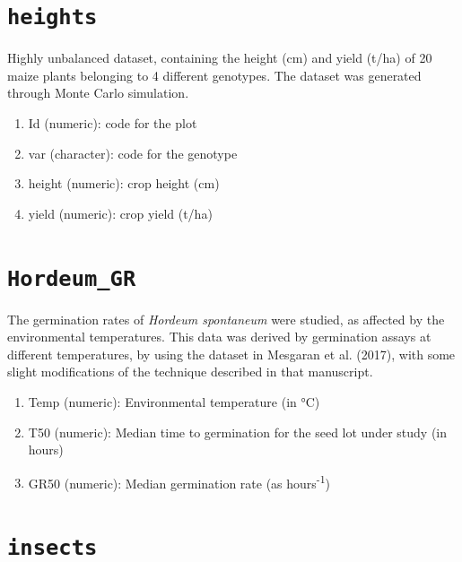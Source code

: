 \documentclass[
  letterpaper,
  DIV=11,
  numbers=noendperiod]{scrreprt}
\providecommand{\tightlist}{%
  \setlength{\itemsep}{0pt}\setlength{\parskip}{0pt}}
\begin{document}
\section*{\texorpdfstring{\texttt{heights}}{heights}}\label{heights}


Highly unbalanced dataset, containing the height (cm) and yield (t/ha)
of 20 maize plants belonging to 4 different genotypes. The dataset was
generated through Monte Carlo simulation.

\begin{enumerate}
\def\labelenumi{\arabic{enumi}.}
\tightlist
\item
  Id (numeric): code for the plot
\item
  var (character): code for the genotype
\item
  height (numeric): crop height (cm)
\item
  yield (numeric): crop yield (t/ha)
\end{enumerate}

\section*{\texorpdfstring{\texttt{Hordeum\_GR}}{Hordeum\_GR}}\label{Hordeum_GR}


The germination rates of \emph{Hordeum spontaneum} were studied, as
affected by the environmental temperatures. This data was derived by
germination assays at different temperatures, by using the dataset in
Mesgaran et al. (2017), with some slight modifications of the technique
described in that manuscript.

\begin{enumerate}
\def\labelenumi{\arabic{enumi}.}
\tightlist
\item
  Temp (numeric): Environmental temperature (in °C)
\item
  T50 (numeric): Median time to germination for the seed lot under study
  (in hours)
\item
  GR50 (numeric): Median germination rate (as hours\textsuperscript{-1})
\end{enumerate}

\section*{\texorpdfstring{\texttt{insects}}{insects}}\label{insects}
\end{document}
